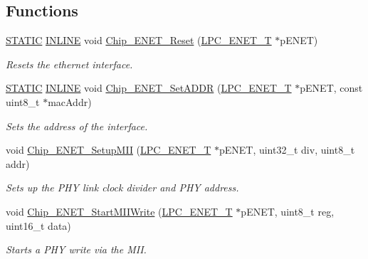 \subsection*{Functions}
\begin{DoxyCompactItemize}
\item 
\hyperlink{group___l_p_c___types___public___macros_ga10b2d890d871e1489bb02b7e70d9bdfb}{S\+T\+A\+T\+IC} \hyperlink{spifi__18xx__43xx_8h_a2eb6f9e0395b47b8d5e3eeae4fe0c116}{I\+N\+L\+I\+NE} void \hyperlink{group___e_n_e_t__18_x_x__43_x_x_gae6567d8fb1d427ecf30ce65f48a074b4}{Chip\+\_\+\+E\+N\+E\+T\+\_\+\+Reset} (\hyperlink{struct_l_p_c___e_n_e_t___t}{L\+P\+C\+\_\+\+E\+N\+E\+T\+\_\+T} $\ast$p\+E\+N\+ET)
\begin{DoxyCompactList}\small\item\em Resets the ethernet interface. \end{DoxyCompactList}\item 
\hyperlink{group___l_p_c___types___public___macros_ga10b2d890d871e1489bb02b7e70d9bdfb}{S\+T\+A\+T\+IC} \hyperlink{spifi__18xx__43xx_8h_a2eb6f9e0395b47b8d5e3eeae4fe0c116}{I\+N\+L\+I\+NE} void \hyperlink{group___e_n_e_t__18_x_x__43_x_x_ga6d915db1de0ba98ac0cdb1df8c59515b}{Chip\+\_\+\+E\+N\+E\+T\+\_\+\+Set\+A\+D\+DR} (\hyperlink{struct_l_p_c___e_n_e_t___t}{L\+P\+C\+\_\+\+E\+N\+E\+T\+\_\+T} $\ast$p\+E\+N\+ET, const uint8\+\_\+t $\ast$mac\+Addr)
\begin{DoxyCompactList}\small\item\em Sets the address of the interface. \end{DoxyCompactList}\item 
void \hyperlink{group___e_n_e_t__18_x_x__43_x_x_ga9694421dbd0f331895fcf514fd18c938}{Chip\+\_\+\+E\+N\+E\+T\+\_\+\+Setup\+M\+II} (\hyperlink{struct_l_p_c___e_n_e_t___t}{L\+P\+C\+\_\+\+E\+N\+E\+T\+\_\+T} $\ast$p\+E\+N\+ET, uint32\+\_\+t div, uint8\+\_\+t addr)
\begin{DoxyCompactList}\small\item\em Sets up the P\+HY link clock divider and P\+HY address. \end{DoxyCompactList}\item 
void \hyperlink{group___e_n_e_t__18_x_x__43_x_x_gade9f31bbc04119bc06638fd8ce874f73}{Chip\+\_\+\+E\+N\+E\+T\+\_\+\+Start\+M\+I\+I\+Write} (\hyperlink{struct_l_p_c___e_n_e_t___t}{L\+P\+C\+\_\+\+E\+N\+E\+T\+\_\+T} $\ast$p\+E\+N\+ET, uint8\+\_\+t reg, uint16\+\_\+t data)
\begin{DoxyCompactList}\small\item\em Starts a P\+HY write via the M\+II. \end{DoxyCompactList}\item 

\end{DoxyCompactItemize}
